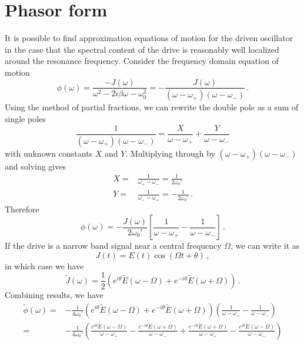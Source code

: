 \documentclass{article}
\begin{document}
\section{Phasor form}

It is possible to find approximation equations of motion for the driven oscillator in the case that the spectral content of the drive is reasonably well localized around the resonance frequency.
Consider the frequency domain equation of motion
\begin{equation}
  \phi(\omega) = \frac{-J(\omega)}{\omega^2 - 2 i \beta \omega - \omega_0^2}
  = - \frac{J(\omega)}{(\omega - \omega_+)(\omega - \omega_-)} \, .
\end{equation}
Using the method of partial fractions, we can rewrite the double pole as a sum of single poles
\begin{equation}
  \frac{1}{(\omega - \omega_+)(\omega - \omega_-)}
  = \frac{X}{\omega - \omega_+} + \frac{Y}{\omega - \omega_-}
\end{equation}
with unknown constants $X$ and $Y$.
Multiplying through by $(\omega - \omega_+)(\omega - \omega_-)$ and solving gives
\begin{align*}
  X =& \frac{1}{\omega_+ - \omega_-} =   \frac{1}{2 \omega_0'} \\
  Y =& \frac{1}{\omega_- - \omega_+} = - \frac{1}{2 \omega_0'} \, .
\end{align*}
Therefore
\begin{equation}
  \phi(\omega) = - \frac{J(\omega)}{2 \omega_0'}
  \left[ \frac{1}{\omega - \omega_+} - \frac{1}{\omega - \omega_-} \right] \, .
\end{equation}
If the drive is a narrow band signal near a central frequency $\Omega$, we can write it as
\begin{equation}
  J(t) = E(t) \cos(\Omega t + \theta) \, ,
\end{equation}
in which case we have
\begin{equation}
  \tilde{J}(\omega) = \frac{1}{2}
  \left(
    e^{i\theta} \tilde{E}(\omega - \Omega) + e^{-i \theta} \tilde{E}(\omega + \Omega)
    \right) \, .
\end{equation}
Combining results, we have
\begin{align*}
  \tilde{\phi}(\omega)
  =& - \frac{1}{4 \omega_0'}
  \left(
    e^{i \theta} \tilde{E}(\omega - \Omega) + e^{-i \theta} \tilde{E}(\omega + \Omega)
  \right)
  \left(
    \frac{1}{\omega - \omega_+} - \frac{1}{\omega - \omega_-}
  \right) \\
  =& - \frac{1}{4 \omega_0'}
  \left(
      \frac{e^{ i \theta} \tilde{E}(\omega - \Omega)}{\omega - \omega_+}
    - \frac{e^{-i \theta} \tilde{E}(\omega + \Omega)}{\omega - \omega_-}
    + \frac{e^{-i \theta} \tilde{E}(\omega + \Omega)}{\omega - \omega_+}
    - \frac{e^{ i \theta} \tilde{E}(\omega - \Omega)}{\omega - \omega_-}
  \right)
\end{align*}
\end{document}
